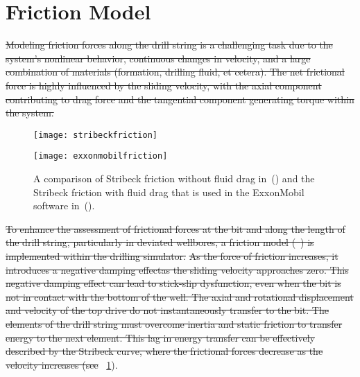 \section{Friction Model}
\sout{
Modeling friction forces along the drill string is a challenging task due to the system's nonlinear behavior, continuous changes in velocity, and a large combination of materials (formation, drilling fluid, et cetera). The net frictional force is highly influenced by the sliding velocity, with the axial component contributing to drag force and the tangential component generating torque within the system.}
\begin{figure}
	\begin{minipage}[t]{\linewidth}
			\begin{minipage}[t]{0.3\linewidth}
				\centering
				\texttt{[image: stribeckfriction]}
				\label{fig:stribeckfriction}
			\end{minipage}
			\hfill
			\begin{minipage}[t]{0.65\linewidth}
				\centering
				\texttt{[image: exxonmobilfriction]}
				\label{fig:exxonmobilfriction}
			\end{minipage}
	\end{minipage}
	\caption[Comparison of friction models]{A comparison of Stribeck friction without fluid drag in~() and the Stribeck friction with fluid drag that is used in the ExxonMobil software in~().}\label{fig:frictionmodels}
\end{figure}
\sout{
To enhance the assessment of frictional forces at the bit and along the length of the drill string, particularly in deviated wellbores, a friction model (~\cite{ref:cayeux2020a}) is implemented within the drilling simulator.}
\sout{
As the force of friction increases, it introduces a negative damping effect}\needsclarification[How so?]\sout{as the sliding velocity approaches zero. This negative damping effect can lead to stick-slip dysfunction, even when the bit is not in contact with the bottom of the well. The axial and rotational displacement and velocity of the top drive do not instantaneously transfer to the bit. The elements of the drill string must overcome inertia and static friction to transfer energy to the next element. This lag in energy transfer can be effectively described by the Stribeck curve, where the frictional forces decrease as the velocity increases (see } \figurename~\ref{fig:frictionmodels}).
